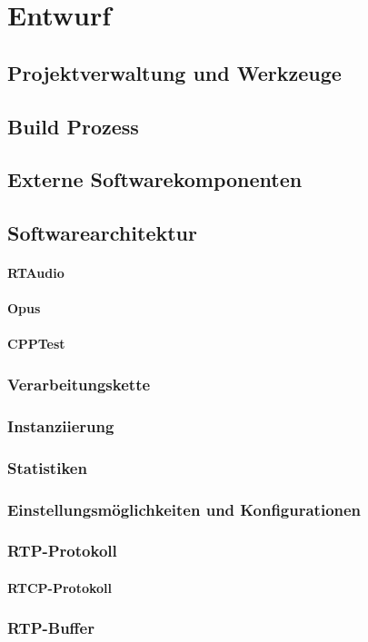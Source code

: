 \chapter{Entwurf}
\section{Projektverwaltung und Werkzeuge}
\section{Build Prozess}
\section{Externe Softwarekomponenten}
\section{Softwarearchitektur}
\subsubsection{RTAudio}
\subsubsection{Opus}
\subsubsection{CPPTest}
\subsection{Verarbeitungskette}
\subsection{Instanziierung}
\subsection{Statistiken}
\subsection{Einstellungsmöglichkeiten und Konfigurationen}
\subsection{RTP-Protokoll}
\subsubsection{RTCP-Protokoll}
\subsection{RTP-Buffer}
